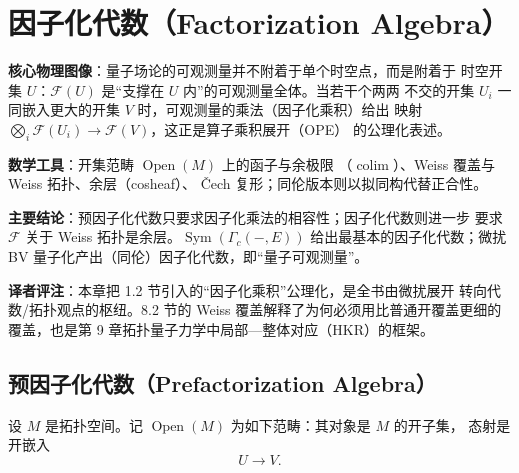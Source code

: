 
\section{因子化代数（Factorization Algebra）}

\begin{keypoints}
  \item \textbf{核心物理图像}：量子场论的可观测量并不附着于单个时空点，而是附着于
        时空开集 $U$：$\mathcal{F}(U)$ 是“支撑在 $U$ 内”的可观测量全体。当若干个两两
        不交的开集 $U_i$ 一同嵌入更大的开集 $V$ 时，可观测量的乘法（因子化乘积）给出
        映射 $\bigotimes_i\mathcal{F}(U_i)\to\mathcal{F}(V)$，这正是算子乘积展开（OPE）
        的公理化表述。
  \item \textbf{数学工具}：开集范畴 $\operatorname{Open}(M)$ 上的函子与余极限
        （$\operatorname{colim}$）、Weiss 覆盖与 Weiss 拓扑、余层（cosheaf）、
        \v{C}ech 复形；同伦版本则以拟同构代替正合性。
  \item \textbf{主要结论}：预因子化代数只要求因子化乘法的相容性；因子化代数则进一步
        要求 $\mathcal{F}$ 关于 Weiss 拓扑是余层。$\operatorname{Sym}(\Gamma_c(-,E))$
        给出最基本的因子化代数；微扰 BV 量子化产出（同伦）因子化代数，即“量子可观测量”。
  \item \textbf{译者评注}：本章把 1.2 节引入的“因子化乘积”公理化，是全书由微扰展开
        转向代数/拓扑观点的枢纽。8.2 节的 Weiss 覆盖解释了为何必须用比普通开覆盖更细的
        覆盖，也是第 9 章拓扑量子力学中局部—整体对应（HKR）的框架。
\end{keypoints}

\subsection{预因子化代数（Prefactorization Algebra）}

设 $M$ 是拓扑空间。记 $\operatorname{Open}(M)$ 为如下范畴：其对象是 $M$ 的开子集，
态射是开嵌入
\[
  U\longrightarrow V.
\]

